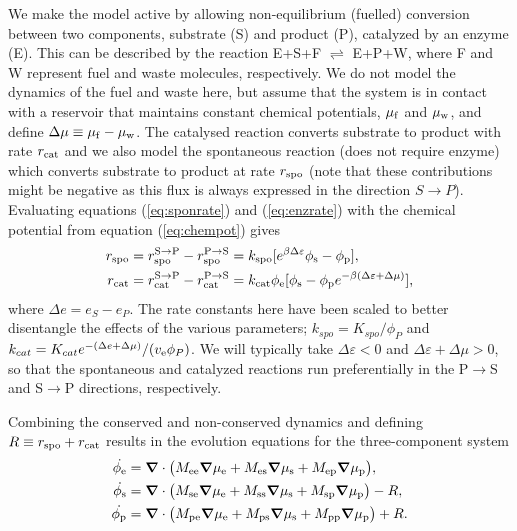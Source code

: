 We make the model active by allowing non-equilibrium (fuelled) conversion between two components, substrate (S) and product (P), catalyzed by an enzyme (E). This can be described by the reaction E+S+F $\rightleftharpoons$ E+P+W, where F and W represent fuel and waste molecules, respectively. We do not model the dynamics of the fuel and waste here, but assume that the system is in contact with a reservoir that maintains constant chemical potentials, $\mu_{\mathrm{f}}$ and $\mu_{\mathrm{w}}$, and define $\Delta\mu \equiv \mu_{\mathrm{f}}-\mu_{\mathrm{w}}$. The catalysed reaction converts substrate to product with rate $r_{\mathrm{cat}}$ and we also model the spontaneous reaction (does not require enzyme) which converts substrate to product at rate $r_{\mathrm{spo}}$ (note that these contributions might be negative as this flux is always expressed in the direction $S \rightarrow P$). Evaluating equations (\ref{eq:sponrate}) and (\ref{eq:enzrate}) with the chemical potential from equation (\ref{eq:chempot}) gives
\begin{align}
    r_{\mathrm{spo}} &= r_{\mathrm{spo}}^{\mathrm{S}\to\mathrm{P}} - r_{\mathrm{spo}}^{\mathrm{P}\to\mathrm{S}} = k_{\mathrm{spo}}[e^{\beta \Delta \varepsilon}\phi_{\mathrm{s}} - \phi_{\mathrm{p}}],
    \label{eq:r_spo} \\
    r_{\mathrm{cat}} &= r_{\mathrm{cat}}^{\mathrm{S}\to\mathrm{P}} - r_{\mathrm{cat}}^{\mathrm{P}\to\mathrm{S}} = k_{\mathrm{cat}}\phi_{\mathrm{e}}[\phi_{\mathrm{s}}-\phi_{\mathrm{p}} e^{-\beta(\Delta \varepsilon+ \Delta\mu)}],
    \label{eq:r_cat}
\end{align}
where $\Delta e = e_S - e_P$. The rate constants here have been scaled to better disentangle the effects of the various parameters; $k_{spo} = K_{spo}/\phi_P$ and $k_{cat} = K_{cat}e^{-(\Delta e + \Delta \mu)}/(v_{\mathrm{e}} \phi_P)$. We will typically take $\Delta \varepsilon<0$ and $\Delta \varepsilon + \Delta \mu>0$, so that the spontaneous and catalyzed reactions run preferentially in the P$\to$S and S$\to$P directions, respectively.

Combining the conserved and non-conserved dynamics and defining $R\equiv r_{\mathrm{spo}}+r_{\mathrm{cat}}$ results in the evolution equations for the three-component system
\begin{align}
    \dot{\phi_{\mathrm{e}}} &= \bm{\nabla} \cdot \big(M_{\mathrm{ee}}\bm{\nabla}\mu_{\mathrm{e}} + M_{\mathrm{es}}\bm{\nabla}\mu_{\mathrm{s}} + M_{\mathrm{ep}}\bm{\nabla}\mu_{\mathrm{p}}\big), \label{eq:evoE}\\
    \dot{\phi_{\mathrm{s}}} &= \bm{\nabla} \cdot \big(M_{\mathrm{se}}\bm{\nabla}\mu_{\mathrm{e}} + M_{\mathrm{ss}}\bm{\nabla}\mu_{\mathrm{s}} + M_{\mathrm{sp}}\bm{\nabla}\mu_{\mathrm{p}}\big) - R, \label{eq:evoS}\\
    \dot{\phi_{\mathrm{p}}} &= \bm{\nabla} \cdot \big(M_{\mathrm{pe}}\bm{\nabla}\mu_{\mathrm{e}} + M_{\mathrm{ps}}\bm{\nabla}\mu_{\mathrm{s}} + M_{\mathrm{pp}}\bm{\nabla}\mu_{\mathrm{p}}\big) + R. \label{eq:evoP}
\end{align}

